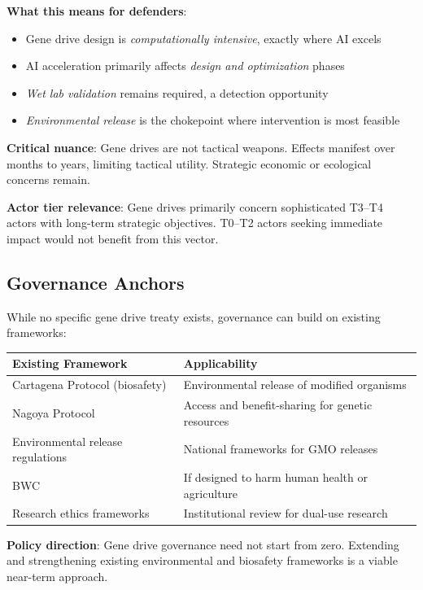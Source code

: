 \documentclass[11pt,letterpaper]{article}
\begin{document}
\textbf{What this means for defenders}:
\begin{itemize}[nosep]
  \item Gene drive design is \textit{computationally intensive}, exactly where AI excels
  \item AI acceleration primarily affects \textit{design and optimization} phases
  \item \textit{Wet lab validation} remains required, a detection opportunity
  \item \textit{Environmental release} is the chokepoint where intervention is most feasible
\end{itemize}

\textbf{Critical nuance}: Gene drives are not tactical weapons. Effects manifest over months to years, limiting tactical utility. Strategic economic or ecological concerns remain.

\textbf{Actor tier relevance}: Gene drives primarily concern sophisticated T3--T4 actors with long-term strategic objectives. T0--T2 actors seeking immediate impact would not benefit from this vector.

\subsection{Governance Anchors}

While no specific gene drive treaty exists, governance can build on existing frameworks:

\begin{center}
\small
\begin{tabular}{L{4cm}L{8cm}}
\toprule
\textbf{Existing Framework} & \textbf{Applicability} \\
\midrule
Cartagena Protocol (biosafety) & Environmental release of modified organisms \\
Nagoya Protocol & Access and benefit-sharing for genetic resources \\
Environmental release regulations & National frameworks for GMO releases \\
BWC & If designed to harm human health or agriculture \\
Research ethics frameworks & Institutional review for dual-use research \\
\bottomrule
\end{tabular}
\end{center}

\textbf{Policy direction}: Gene drive governance need not start from zero. Extending and strengthening existing environmental and biosafety frameworks is a viable near-term approach.
\end{document}

